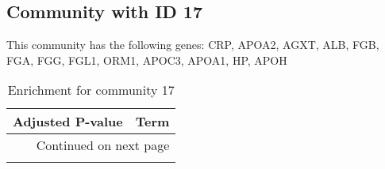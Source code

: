 \subsection*{Community with ID 17}
This community has the following genes: CRP, APOA2, AGXT, ALB, FGB, FGA, FGG, FGL1, ORM1, APOC3, APOA1, HP, APOH
\\
\begin{longtable}{p{2.4cm}p{14.5cm}}
\caption{Enrichment for community 17}\\
\toprule
Adjusted \newline P-value &                                                                                                                      Term \\
\midrule
\endhead
\midrule
\multicolumn{2}{r}{{Continued on next page}} \\
\midrule
\endfoot


\end{longtable}
